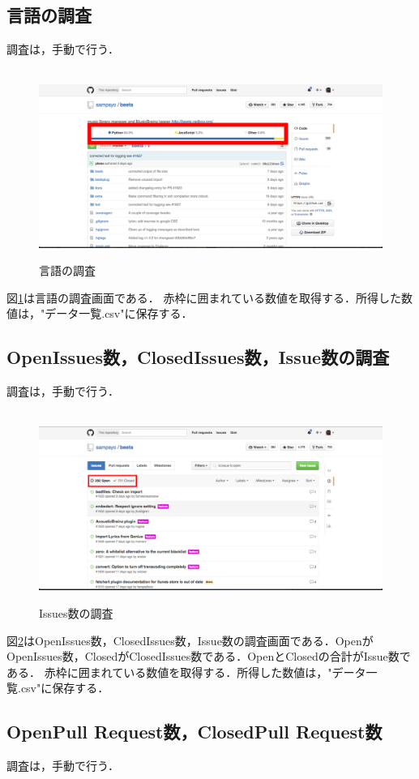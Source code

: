 \subsection{言語の調査}
調査は，手動で行う．
\begin{figure}[H]
\centering　
\includegraphics[width=13cm]{language.png}
\caption{言語の調査}\label{tab:言語}
\end{figure}
図\ref{tab:言語}は言語の調査画面である．
赤枠に囲まれている数値を取得する．所得した数値は，"データ一覧.csv"に保存する．


\subsection{OpenIssues数，ClosedIssues数，Issue数の調査}

調査は，手動で行う．

\begin{figure}[H]
\centering　
\includegraphics[width=13cm]{Issues.png}
\caption{Issues数の調査}\label{tab:Issues}
\end{figure}
図\ref{tab:Issues}はOpenIssues数，ClosedIssues数，Issue数の調査画面である．OpenがOpenIssues数，ClosedがClosedIssues数である．OpenとClosedの合計がIssue数である．
赤枠に囲まれている数値を取得する．所得した数値は，"データ一覧.csv"に保存する．

\subsection{OpenPull Request数，ClosedPull Request数}
調査は，手動で行う．

